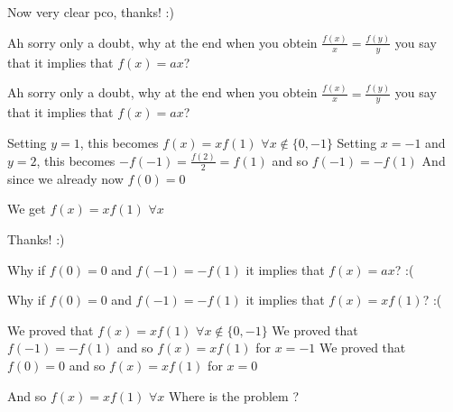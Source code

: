 \begin{solution}
	Now very clear pco, thanks! :)
\end{solution}



\begin{solution}
	Ah sorry only a doubt, why at the end when you obtein $\frac{f(x)}{x} =\frac{f(y)}{y}$ you say that it implies that $f(x)=ax$?
\end{solution}



\begin{solution}
	\begin{tcolorbox}Ah sorry only a doubt, why at the end when you obtein $\frac{f(x)}{x} =\frac{f(y)}{y}$ you say that it implies that $f(x)=ax$?\end{tcolorbox}
Setting $y=1$, this becomes $f(x)=xf(1)$ $\forall x\notin\{0,-1\}$
Setting $x=-1$ and $y=2$, this becomes $-f(-1)=\frac{f(2)}2=f(1)$ and so $f(-1)=-f(1)$
And since we already now $f(0)=0$

We get $f(x)=xf(1)$ $\forall x$


\end{solution}



\begin{solution}
	Thanks! :)
\end{solution}



\begin{solution}
	Why if $f(0)=0$ and $f(-1)=-f(1)$ it implies that $f(x)=ax$? :(
\end{solution}



\begin{solution}
	\begin{tcolorbox}Why if $f(0)=0$ and $f(-1)=-f(1)$ it implies that $f(x)=xf(1)$? :(\end{tcolorbox}

We proved that $f(x)=xf(1)$ $\forall x\notin\{0,-1\}$
We proved that $f(-1)=-f(1)$ and so $f(x)=xf(1)$ for $x=-1$
We proved that $f(0)=0$ and so $f(x)=xf(1)$ for $x=0$

And so $f(x)=xf(1)$ $\forall x$
Where is the problem ?

\end{solution}



